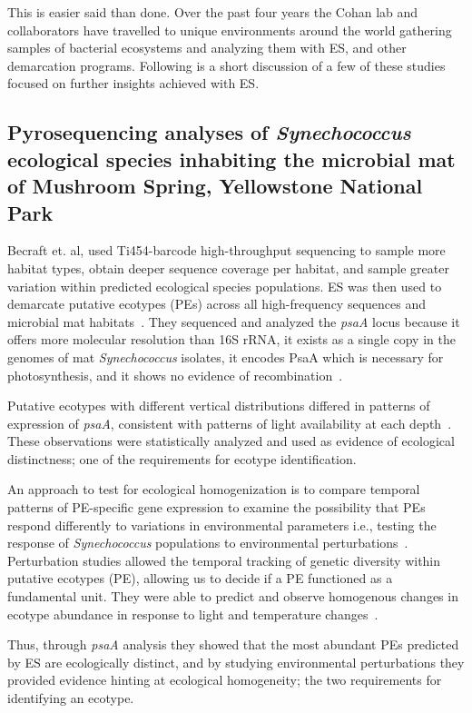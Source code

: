 This is easier said than done.
Over the past four years the Cohan lab and collaborators have travelled to unique environments around the world gathering samples of bacterial ecosystems and analyzing them with ES, and other demarcation programs.
Following is a short discussion of a few of these studies focused on further insights achieved with ES.

\subsection*{Pyrosequencing analyses of \emph{Synechococcus} ecological species inhabiting the microbial mat of Mushroom Spring, Yellowstone National Park}
Becraft et. al, used Ti454-barcode high-throughput sequencing to sample more habitat types, obtain deeper sequence coverage per habitat, and sample greater variation within predicted ecological species populations.
ES was then used to demarcate putative ecotypes (PEs) across all high-frequency sequences and microbial mat habitats~\cite{pyroEric}. They sequenced and analyzed the \emph{psaA} locus because it offers more molecular resolution than 16S rRNA, it exists as a single copy in the genomes of mat \emph{Synechococcus} isolates, it encodes PsaA which is necessary for photosynthesis, and it shows no evidence of recombination~\cite{pyroEric}.

Putative ecotypes with different vertical distributions differed in patterns of expression of \emph{psaA}, consistent with patterns of light availability at each depth~\cite{pyroEric}.
These observations were statistically analyzed and used as evidence of ecological distinctness; one of the requirements for ecotype identification.

An approach to test for ecological homogenization is to compare temporal patterns of PE-specific gene expression to examine the possibility that PEs respond differently to variations in environmental parameters i.e., testing the response of \emph{Synechococcus} populations to environmental perturbations~\cite{pyroEric}.
Perturbation studies allowed the temporal tracking of genetic diversity within putative ecotypes (PE), allowing us to decide if a PE functioned as a fundamental unit.
They were able to predict and observe homogenous changes in ecotype abundance in response to light and temperature changes~\cite{pyroEric}.

Thus, through \emph{psaA} analysis they showed that the most abundant PEs predicted by ES are ecologically distinct, and by studying environmental perturbations they provided evidence hinting at ecological homogeneity; the two requirements for identifying an ecotype.

